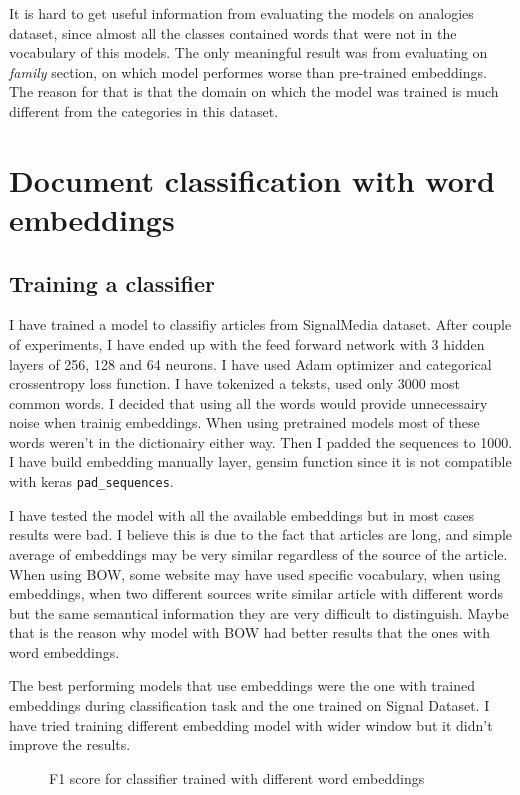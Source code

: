 \documentclass{article}
\begin{document}
It is hard to get useful information from evaluating the models on analogies dataset,
since almost all the classes contained words that were not in the vocabulary of this models.
The only meaningful result was from evaluating on \textit{family} section, on which model performes
worse than pre-trained embeddings. The reason for that is that the domain on which the model was 
trained is much different from the categories in this dataset.

\section{Document classification with word embeddings}

\subsection{Training a classifier}
I have trained a model to classifiy articles from SignalMedia dataset.
After couple of experiments, I have ended up with the feed forward network with
3 hidden layers of 256, 128 and 64 neurons. I have used Adam optimizer and
categorical crossentropy loss function. I have tokenized a teksts, used only 3000 most
common words. I decided that using all the words would provide unnecessairy noise
when trainig embeddings. When using pretrained models most of these words
weren't in the dictionairy either way. Then I padded the sequences
to 1000. I have build embedding manually layer, gensim function since it is not
compatible with keras \lstinline{pad_sequences}.

I have tested the model with all the available embeddings but in most cases
results were bad. I believe this is due to the fact that articles are long, and
simple average of embeddings may be very similar regardless of the source of the article.
When using BOW, some website may have used specific vocabulary, when using embeddings,
when two different sources write similar article with different words but the same
semantical information they are very difficult to distinguish. Maybe that is the reason
why model with BOW had better results that the ones with word embeddings.

The best performing models that use embeddings were the one with trained embeddings during
classification task and the one trained on Signal Dataset. I have tried training different
embedding model with wider window but it didn't improve the results. 


\begin{figure}[h]
	\centering
	
	\caption{F1 score for classifier trained with different word embeddings}
\end{figure}
\end{document}
